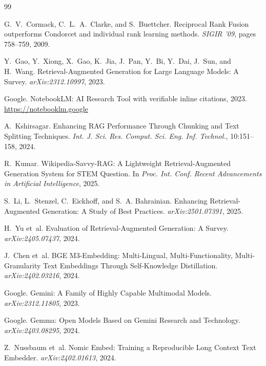 \documentclass[11pt,a4paper]{article}
\begin{document}
\begin{thebibliography}{99}

G.~V.~Cormack, C.~L.~A.~Clarke, and S.~Buettcher.
\newblock Reciprocal Rank Fusion outperforms Condorcet and individual rank learning methods.
\newblock \textit{SIGIR '09}, pages 758--759, 2009.

Y.~Gao, Y.~Xiong, X.~Gao, K.~Jia, J.~Pan, Y.~Bi, Y.~Dai, J.~Sun, and H.~Wang.
\newblock Retrieval-Augmented Generation for Large Language Models: A Survey.
\newblock \textit{arXiv:2312.10997}, 2023.

Google.
\newblock NotebookLM: AI Research Tool with verifiable inline citations, 2023.
\newblock \url{https://notebooklm.google}

A.~Kshirsagar.
\newblock Enhancing RAG Performance Through Chunking and Text Splitting Techniques.
\newblock \textit{Int. J. Sci. Res. Comput. Sci. Eng. Inf. Technol.}, 10:151--158, 2024.

R.~Kumar.
\newblock Wikipedia-Savvy-RAG: A Lightweight Retrieval-Augmented Generation System for STEM Question.
\newblock In \textit{Proc. Int. Conf. Recent Advancements in Artificial Intelligence}, 2025.

S.~Li, L.~Stenzel, C.~Eickhoff, and S.~A. Bahrainian.
\newblock Enhancing Retrieval-Augmented Generation: A Study of Best Practices.
\newblock \textit{arXiv:2501.07391}, 2025.

H.~Yu et~al.
\newblock Evaluation of Retrieval-Augmented Generation: A Survey.
\newblock \textit{arXiv:2405.07437}, 2024.

J.~Chen et~al.
\newblock BGE M3-Embedding: Multi-Lingual, Multi-Functionality, Multi-Granularity Text Embeddings Through Self-Knowledge Distillation.
\newblock \textit{arXiv:2402.03216}, 2024.

Google.
\newblock Gemini: A Family of Highly Capable Multimodal Models.
\newblock \textit{arXiv:2312.11805}, 2023.

Google.
\newblock Gemma: Open Models Based on Gemini Research and Technology.
\newblock \textit{arXiv:2403.08295}, 2024.

Z.~Nussbaum et~al.
\newblock Nomic Embed: Training a Reproducible Long Context Text Embedder.
\newblock \textit{arXiv:2402.01613}, 2024.


\end{thebibliography}
\end{document}
